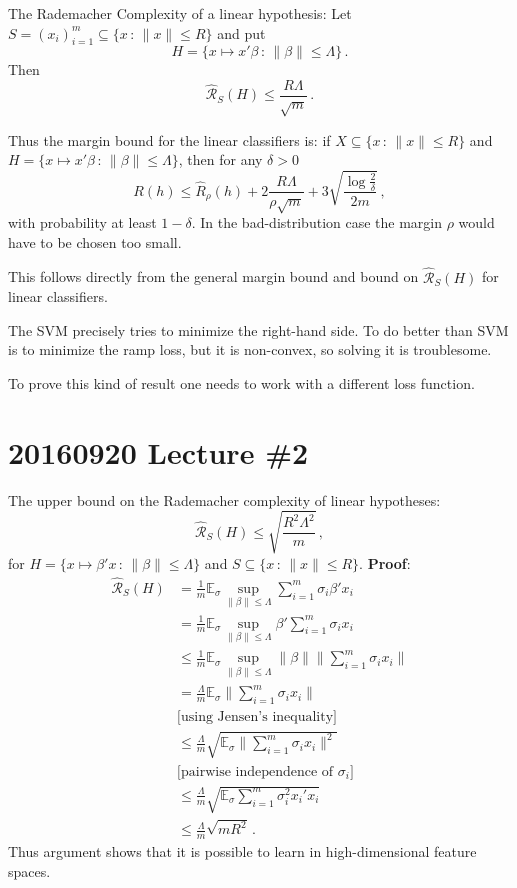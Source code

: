 \documentclass[a4paper]{article}
\newcommand{\ex}{\mathbb{E}}
\begin{document}
The Rademacher Complexity of a linear hypothesis:
Let $S = (x_i)_{i=1}^m \subseteq \{x\,:\,\|x\|\leq R\}$ and put
\[ H = \{x\mapsto x'\beta\,:\,\|\beta\|\leq \Lambda\} \,. \]
Then
\[ \hat{\mathcal{R}}_S(H) \leq \frac{R \Lambda}{\sqrt{m}} \,. \]

Thus the margin bound for the linear classifiers is: if $X\subseteq \{x\,:\, \|x\|\leq R\}$
and $H = \{x\mapsto x'\beta \,:\, \|\beta\| \leq \Lambda\}$, then for any $\delta > 0$
\[ R(h) \leq \hat{R}_\rho(h) + 2\frac{R\Lambda}{\rho \sqrt{m}}
    + 3\sqrt{\frac{\log \frac{2}{\delta}}{2m}}
    \,, \]
with probability at least $1-\delta$. In the bad-distribution case the margin $\rho$
would have to be chosen too small.

This follows directly from the general margin bound and bound on $\hat{\mathcal{R}}_S(H)$
for linear classifiers.

\noindent The SVM precisely tries to minimize the right-hand side. To do better than
SVM is to minimize the ramp loss, but it is non-convex, so solving it is troublesome.

To prove this kind of result one needs to work with a different loss function.



\section{20160920 Lecture \#2} %
\label{sec:20160920_lecture_2}

The upper bound on the Rademacher complexity of linear hypotheses:
\[\hat{\mathcal{R}}_S(H) \leq \sqrt{\frac{R^2 \Lambda^2}{m}} \,, \]
for $H = \{x\mapsto\beta'x \,:\, \|\beta\|\leq \Lambda \}$ and
$S\subseteq \{x\,:\,\|x\|\leq R\}$. \textbf{Proof}:
\begin{align*}
    \hat{\mathcal{R}}_S(H)
        &= \frac{1}{m} \ex_\sigma \sup_{\|\beta\|\leq \Lambda} \sum_{i=1}^m \sigma_i \beta'x_i \\
        &= \frac{1}{m} \ex_\sigma \sup_{\|\beta\|\leq \Lambda} \beta' \sum_{i=1}^m \sigma_i x_i \\
        &\leq \frac{1}{m} \ex_\sigma \sup_{\|\beta\|\leq \Lambda} \|\beta\| \bigl\|\sum_{i=1}^m \sigma_i x_i \bigr\| \\
        &= \frac{\Lambda}{m} \ex_\sigma \bigl\|\sum_{i=1}^m \sigma_i x_i \bigr\| \\
        &\bigl[\text{using Jensen's inequality}\bigr]\\
        &\leq \frac{\Lambda}{m} \sqrt{\ex_\sigma \bigl\|\sum_{i=1}^m \sigma_i x_i \bigr\|^2} \\
        &\bigl[\text{pairwise independence of } \sigma_i\bigr]\\
        &\leq \frac{\Lambda}{m} \sqrt{\ex_\sigma \sum_{i=1}^m \sigma_i^2 x_i'x_i } \\
        &\leq \frac{\Lambda}{m} \sqrt{m R^2 } \,.
\end{align*}
Thus argument shows that it is possible to learn in high-dimensional feature spaces.
\end{document}
